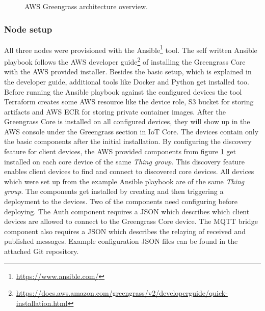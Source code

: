 \begin{figure}[H]
    \fontsize{7}{10}\selectfont
    \centering
    \def\svgwidth{\textwidth}
    
    \caption{AWS Greengrass architecture overview.}
    \label{fig:aws-ggc-arch}
\end{figure}

\subsubsection*{Node setup}\label{subsubsec:aws-ggc-devices}
All three nodes were provisioned with the Ansible\footnote{\url{https://www.ansible.com/}} tool. The self written Ansible playbook follows the \gls{AWS} developer guide\footnote{\url{https://docs.aws.amazon.com/greengrass/v2/developerguide/quick-installation.html}} of installing the Greengrass Core with the \gls{AWS} provided installer. Besides the basic setup, which is explained in the developer guide, additional tools like Docker and Python get installed too. Before running the Ansible playbook against the configured devices the tool Terraform creates some \gls{AWS} resource like the device role, S3 bucket for storing artifacts and \gls{AWS} \gls{ECR} for storing private container images. After the Greengrass Core is installed on all configured devices, they will show up in the \gls{AWS} console under the Greengrass section in IoT Core. The devices contain only the basic components after the initial installation. By configuring the discovery feature for client devices, the \gls{AWS} provided components from figure \ref{fig:aws-ggc-arch} get installed on each core device of the same \textit{Thing group}. This discovery feature enables client devices to find and connect to discovered core devices. All devices which were set up from the example Ansible playbook are of the same \textit{Thing group}. The components get installed by creating and then triggering a deployment to the devices. Two of the components need configuring before deploying. The Auth component requires a JSON which describes which client devices are allowed to connect to the Greengrass Core device. The \gls{MQTT} bridge component also requires a JSON which describes the relaying of received and published messages. Example configuration JSON files can be found in the attached Git repository.

\newpage
